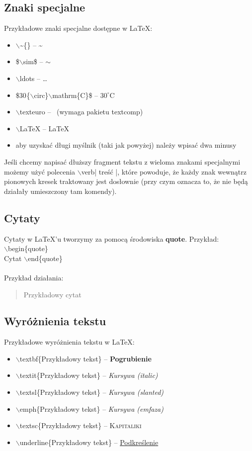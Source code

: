 \documentclass[a4paper, 12pt]{article}
\begin{document}
\subsection{Znaki specjalne}
Przykładowe znaki specjalne dostępne w \LaTeX :
\begin{itemize}
	\item $\backslash$\~{}\{\} -- \~{}
	\item \$$\backslash$sim\$ -- $\sim$
	\item $\backslash$ldots -- \ldots
	\item \$30$^{}$\{$\backslash$circ\}$\backslash$mathrm\{C\}\$ -- $30^{\circ}\mathrm{C}$
	\item $\backslash$texteuro -- \texteuro ~(wymaga pakietu textcomp)
	\item $\backslash$LaTeX -- \LaTeX
	\item aby uzyskać długi myślnik (taki jak powyżej) należy wpisać dwa minusy
\end{itemize}
Jeśli chcemy napisać dłuższy fragment tekstu z wieloma znakami specjalnymi możemy użyć polecenia $\backslash$verb| treść |, które powoduje, że każdy znak wewnątrz pionowych kresek traktowany jest dosłownie (przy czym oznacza to, że nie będą działały umieszczony tam komendy).
\subsection{Cytaty}
Cytaty w \LaTeX 'u tworzymy za pomocą środowiska \textbf{quote}. Przykład: \\
$\backslash$begin\{quote\} \\
Cytat
$\backslash$end\{quote\} \\
\\
Przykład działania:
\begin{quote}
Przykładowy cytat
\end{quote}

\subsection{Wyróżnienia tekstu}
Przykładowe wyróżnienia tekstu w \LaTeX :
\begin{itemize}
	\item $\backslash$textbf\{Przykładowy tekst\} -- \textbf{Pogrubienie}
	\item $\backslash$textit\{Przykładowy tekst\} -- \textit{Kursywa (italic)}
	\item $\backslash$textsl\{Przykładowy tekst\} -- \textsl{Kursywa (slanted)}
	\item $\backslash$emph\{Przykładowy tekst\} -- \emph{Kursywa (emfaza)}
	\item $\backslash$textsc\{Przykładowy tekst\} -- \textsc{Kapitaliki}
	\item $\backslash$underline\{Przykładowy tekst\} -- \underline{Podkreślenie}
\end{itemize}
\end{document}
